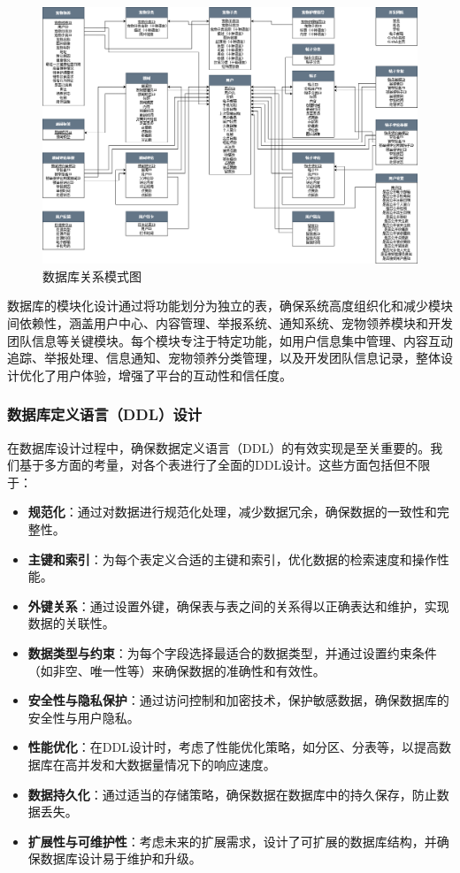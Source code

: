 \begin{figure}[htbp]
	\centering
	\includegraphics[width=\textwidth]{figures/RelationshipSchema.png}
	\caption{数据库关系模式图}
	\label{fig:RelationshipSchema}
\end{figure}

数据库的模块化设计通过将功能划分为独立的表，确保系统高度组织化和减少模块间依赖性，涵盖用户中心、内容管理、举报系统、通知系统、宠物领养模块和开发团队信息等关键模块。每个模块专注于特定功能，如用户信息集中管理、内容互动追踪、举报处理、信息通知、宠物领养分类管理，以及开发团队信息记录，整体设计优化了用户体验，增强了平台的互动性和信任度。

\subsubsection{数据库定义语言（DDL）设计}

在数据库设计过程中，确保数据定义语言（DDL）的有效实现是至关重要的。我们基于多方面的考量，对各个表进行了全面的DDL设计。这些方面包括但不限于：

\begin{itemize}
	\item \textbf{规范化}：通过对数据进行规范化处理，减少数据冗余，确保数据的一致性和完整性。
	\item \textbf{主键和索引}：为每个表定义合适的主键和索引，优化数据的检索速度和操作性能。
	\item \textbf{外键关系}：通过设置外键，确保表与表之间的关系得以正确表达和维护，实现数据的关联性。
	\item \textbf{数据类型与约束}：为每个字段选择最适合的数据类型，并通过设置约束条件（如非空、唯一性等）来确保数据的准确性和有效性。
	\item \textbf{安全性与隐私保护}：通过访问控制和加密技术，保护敏感数据，确保数据库的安全性与用户隐私。
	\item \textbf{性能优化}：在DDL设计时，考虑了性能优化策略，如分区、分表等，以提高数据库在高并发和大数据量情况下的响应速度。
	\item \textbf{数据持久化}：通过适当的存储策略，确保数据在数据库中的持久保存，防止数据丢失。
	\item \textbf{扩展性与可维护性}：考虑未来的扩展需求，设计了可扩展的数据库结构，并确保数据库设计易于维护和升级。
\end{itemize}

